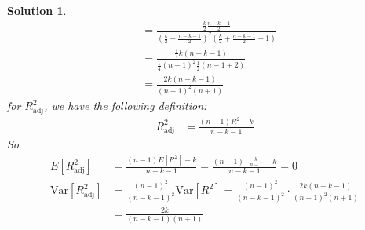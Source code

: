 \documentclass[11pt]{article}
\newtheorem{sol}{Solution}
\begin{document}
\begin{sol}
\begin{align*}
		&= \frac{\frac{k}{2}\frac{n - k - 1}{2}}{(\frac{k}{2} + \frac{n - k - 1}{2})^2(\frac{k}{2} + \frac{n - k - 1}{2} + 1)}\\
		&= \frac{\frac{1}{4}k(n - k - 1)}{\frac{1}{4}(n - 1)^2\frac{1}{2}(n - 1 + 2)}\\
		&= \frac{2k(n - k - 1)}{(n - 1)^2(n + 1)}
	\end{align*}
	for $R^2_{\text{adj}}$, we have the following definition:
	\begin{align*}
		R^2_{\text{adj}} &= \frac{(n- 1)R^2 - k}{n - k - 1}
	\end{align*}
	So 
	\begin{align*}
		E[R^2_{\text{adj}}] &= \frac{(n - 1)E[R^2] - k}{n - k - 1} = \frac{(n - 1)\cdot \frac{k}{n - 1} - k}{n - k - 1} = 0\\
		\text{Var}[R^2_{\text{adj}}] &= \frac{(n - 1)^2}{(n - k - 1)^2}\text{Var}[R^2] = \frac{(n - 1)^2}{(n - k - 1)^2}\cdot \frac{2k(n - k - 1)}{(n - 1)^2(n + 1)}\\
		&= \frac{2k}{(n - k - 1)(n + 1)}
	\end{align*}
\end{sol}
\end{document}
